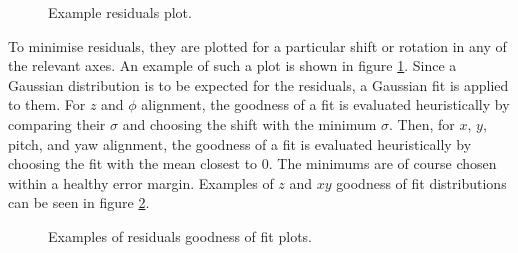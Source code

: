     \begin{figure}[b!]
        \centering{}
        \caption{Example residuals plot.}
        \label{fig::res_example}
    \end{figure}

    To minimise residuals, they are plotted for a particular shift or rotation in any of the relevant axes.
    An example of such a plot is shown in figure \ref{fig::res_example}.
    Since a Gaussian distribution is to be expected for the residuals, a Gaussian fit is applied to them.
    For $z$ and $\phi$ alignment, the goodness of a fit is evaluated heuristically by comparing their $\sigma$ and choosing the shift with the minimum $\sigma$.
    Then, for $x$, $y$, pitch, and yaw alignment, the goodness of a fit is evaluated heuristically by choosing the fit with the mean closest to $0$.
    The minimums are of course chosen within a healthy error margin.
    Examples of $z$ and $xy$ goodness of fit distributions can be seen in figure \ref{fig::resfit_example}.

    \begin{figure}[t!]
        \centering{}
        \caption{Examples of residuals goodness of fit plots.}
        \label{fig::resfit_example}
    \end{figure}

